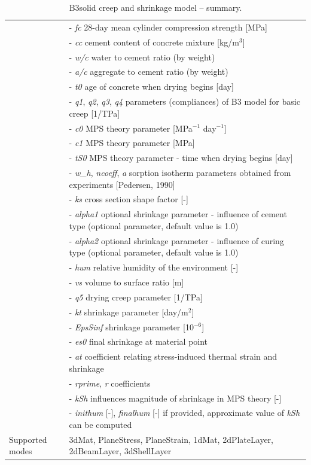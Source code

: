 \documentclass[a4paper]{article}
\newcommand{\param}[1]{{\it #1}}
\begin{document}
\begin{table}
\begin{tabular}{|l|p{9cm}|}
\hline
&- \param{fc} 28-day mean cylinder compression strength [MPa]\\
&- \param{cc} cement content of concrete mixture  [kg/m$^{3}$] \\
&- \param{w/c} water to cement ratio (by weight)\\
&- \param{a/c} aggregate to cement ratio (by weight)\\
&- \param{t0} age of concrete when drying begins [day]\\
&- \param{q1}, \param{q2}, \param{q3}, \param{q4} parameters
(compliances) of B3 model for basic creep [1/TPa]\\

&- \param{c0} MPS theory parameter [MPa$^{-1}$ day$^{-1}$] \\
&- \param{c1} MPS theory parameter [MPa]\\
&- \param{tS0} MPS theory parameter - time when drying begins [day]\\
&- \param{w\_h}, \param{ncoeff}, \param{a} sorption isotherm parameters obtained from experiments [Pedersen, 1990] \\

&- \param{ks} cross section shape factor [-]\\
&- \param{alpha1} optional shrinkage parameter - influence of cement type (optional parameter, default value is 1.0)\\
&- \param{alpha2} optional shrinkage parameter - influence of curing type (optional parameter, default value is 1.0)\\
&- \param{hum} relative humidity of the environment [-]\\
&- \param{vs} volume to surface ratio [m]\\
&- \param{q5} drying creep parameter [1/TPa]\\
&- \param{kt} shrinkage parameter [day/m$^2$]\\
&- \param{EpsSinf} shrinkage parameter [10$^{-6}$]\\

&- \param{es0} final shrinkage at material point\\
&- \param{at} coefficient relating stress-induced thermal strain and shrinkage\\
&- \param{rprime}, \param{r} coefficients\\

&- \param{kSh} influences magnitude of shrinkage in MPS theory [-]\\
&- \param{inithum} [-], \param{finalhum} [-] if provided, approximate value of \param{kSh} can be computed\\


Supported modes& 3dMat, PlaneStress, PlaneStrain, 1dMat,
2dPlateLayer, 2dBeamLayer, 3dShellLayer\\
\hline
\end{tabular}

\caption{B3solid creep and shrinkage model -- summary.}
\label{b3solid_table}

\end{table}
\end{document}
